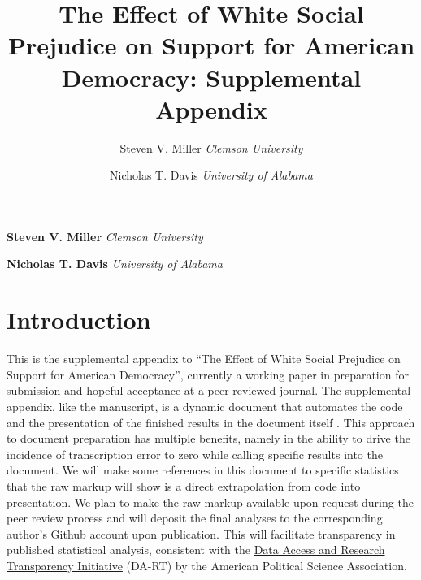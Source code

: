 \documentclass[11pt,]{article}
\title{The Effect of White Social Prejudice on Support for American Democracy: Supplemental Appendix  }
\author{\Large Steven V. Miller\vspace{0.05in} \newline\normalsize\emph{Clemson University}   \and \Large Nicholas T. Davis\vspace{0.05in} \newline\normalsize\emph{University of Alabama}  }
\date{}
\newcommand*{\authorfont}{\fontfamily{phv}\selectfont}
\begin{document}
	
%

{%
\setlength{\parindent}{0pt}
\thispagestyle{plain}
{\fontsize{18}{20}\selectfont\raggedright 
\maketitle  %

}

{
   \vskip 13.5pt\relax \normalsize\fontsize{11}{12} 
\textbf{\authorfont Steven V. Miller} \hskip 15pt \emph{\small Clemson University}   \par \textbf{\authorfont Nicholas T. Davis} \hskip 15pt \emph{\small University of Alabama}   

}

}






\vskip -8.5pt

{
\hypersetup{linkcolor=black}
\setcounter{tocdepth}{2}
\tableofcontents
}


\noindent  

\newpage
\singlespacing

\listoffigures

\listoftables

\newpage

\singlespacing

\hypertarget{introduction}{%
\section{Introduction}\label{introduction}}

This is the supplemental appendix to ``The Effect of White Social
Prejudice on Support for American Democracy'', currently a working paper
in preparation for submission and hopeful acceptance at a peer-reviewed
journal. The supplemental appendix, like the manuscript, is a dynamic
document that automates the code and the presentation of the finished
results in the document itself \citep{xie2013ddrk}. This approach to
document preparation has multiple benefits, namely in the ability to
drive the incidence of transcription error to zero while calling
specific results into the document. We will make some references in this
document to specific statistics that the raw markup will show is a
direct extrapolation from code into presentation. We plan to make the
raw markup available upon request during the peer review process and
will deposit the final analyses to the corresponding author's Github
account upon publication. This will facilitate transparency in published
statistical analysis, consistent with the
\href{http://www.dartstatement.org/}{Data Access and Research
Transparency Initiative} (DA-RT) by the American Political Science
Association.
\end{document}
